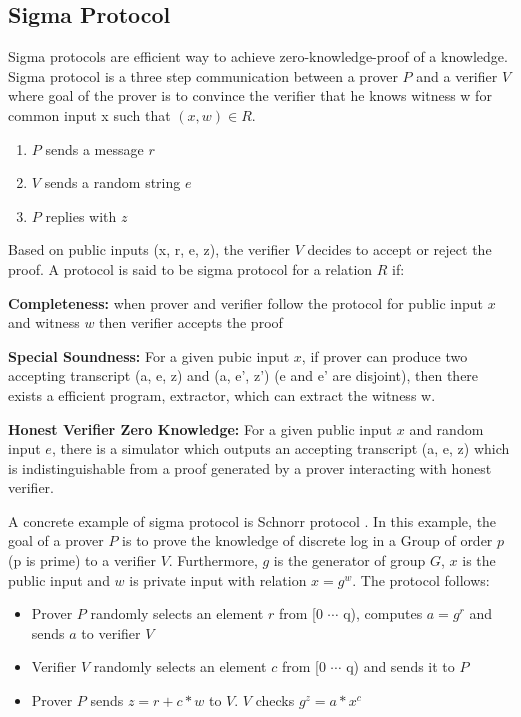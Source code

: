\begin{enumerate}
{        
   
    \subsection{Sigma Protocol}
    \label{sec:sigma}
     Sigma protocols are efficient way to achieve zero-knowledge-proof of a knowledge.   Sigma protocol is 
     a three step communication between a prover $P$ and a verifier $V$ where goal of the prover is to convince the verifier that 
     he knows witness w for common input x such that  $(x, w) \in R$.   
     
     \begin{enumerate}
     \item $P$ sends a message $r$
     \item $V$ sends a random string $e$
     \item $P$ replies with $z$
     \end{enumerate}
     
     Based on public inputs (x, r, e, z), the verifier $V$ decides to accept or reject the proof.   A protocol is 
     said to be sigma protocol for a relation $R$ if: 
     
     \textbf{Completeness:} when prover and verifier follow the protocol for public input $x$ and witness $w$ 
          then verifier accepts the proof
          
      \textbf{Special Soundness:} For a given pubic input $x$, if prover can produce two accepting transcript (a, e, z) 
      and (a, e', z') (e and e' are disjoint), then there exists a efficient program, extractor, which can extract the 
      witness w.
      
      \textbf{Honest Verifier Zero Knowledge:} For a given public input $x$ and random input $e$, there is a simulator 
      which outputs an accepting transcript (a, e, z) which is indistinguishable from a proof generated by 
      a prover interacting with honest verifier. 
     
     A concrete example of sigma protocol is Schnorr protocol \citep{10.1007/3-540-48658-5_19}. In this example, 
     the goal of a prover $P$ is
     to prove the knowledge of discrete log in a Group of order $p$ (p is prime) to a verifier $V$.
     Furthermore, $g$ is the generator of 
     group $G$, $x$ is the public input and $w$ is private input with relation $x = g^w$. The protocol follows:
     
     \begin{itemize}
     \item Prover $P$ randomly selects an element $r$ from [0 $\dotsb$ q), computes $a = g^r$ and sends $a$ to verifier $V$
     \item Verifier $V$ randomly selects an element $c$ from [0 $\dotsb$ q) and sends it to $P$
     \item Prover $P$ sends $z = r + c * w $ to $V$.  $V$ checks $g^{z} = a * x^{c}$
     \end{itemize}
     
}
\end{enumerate}
